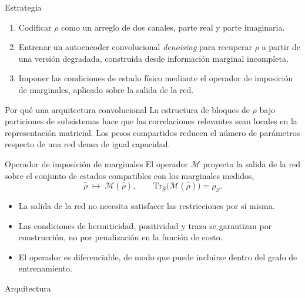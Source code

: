 \documentclass[10pt,aspectratio=169]{beamer}
\newcommand{\Tr}{\mathrm{Tr}}
\newcommand{\dens}{\rho}
\newcommand{\densh}{\hat{\rho}}
\begin{document}
\begin{frame}{Estrategia}
  \begin{enumerate}
    \item Codificar $\dens$ como un arreglo de dos canales, parte real y parte imaginaria.
    \pause
    \item Entrenar un autoencoder convolucional \emph{denoising} para recuperar $\dens$ a partir de una versión degradada, construida desde información marginal incompleta.
    \pause
    \item Imponer las condiciones de estado físico mediante el operador de imposición de marginales, aplicado sobre la salida de la red.
  \end{enumerate}
  \pause
  \vfill
  \begin{block}{Por qué una arquitectura convolucional}
    La estructura de bloques de $\dens$ bajo particiones de subsistemas hace que las correlaciones relevantes sean locales en la representación matricial. Los pesos compartidos reducen el número de parámetros respecto de una red densa de igual capacidad.
  \end{block}
\end{frame}

\begin{frame}{Operador de imposición de marginales}
  El operador $\mathcal{M}$ proyecta la salida de la red sobre el conjunto de estados compatibles con los marginales medidos,
  \[
    \densh \;\longmapsto\; \mathcal{M}(\densh),
    \qquad
    \Tr_{\bar S}\big(\mathcal{M}(\densh)\big) = \dens_S .
  \]
  \pause
  \vfill
  \begin{itemize}
    \item La salida de la red no necesita satisfacer las restricciones por sí misma.
    \item Las condiciones de hermiticidad, positividad y traza se garantizan por construcción, no por penalización en la función de costo.
    \item El operador es diferenciable, de modo que puede incluirse dentro del grafo de entrenamiento.
  \end{itemize}
\end{frame}

\begin{frame}{Arquitectura}
  \begin{center}
  \end{center}
  \vfill
\end{frame}
\end{document}
